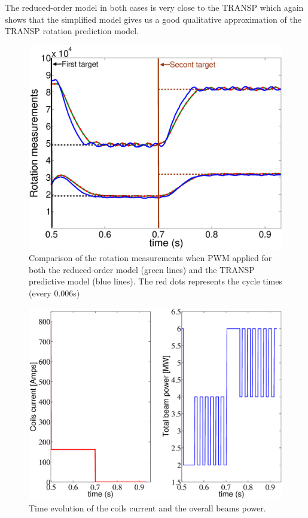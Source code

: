 \documentclass[12pt]{iopart}
\begin{document}
The reduced-order model in both cases is very close to the TRANSP which again shows that the simplified model gives us a good qualitative approximation of the TRANSP rotation prediction model.

\begin{figure}
\centering
\includegraphics[width=\linewidth]{imene_figs/Goum16l}
\caption{Comparison of the rotation measurements when PWM applied for both the reduced-order model (green lines) and the TRANSP predictive model (blue lines). The red dots represents the cycle times (every 0.006s)}
\label{fig:rot16}
\end{figure}

\begin{figure}
\centering
\includegraphics[width=\linewidth]{imene_figs/Goum17l}
\caption{Time evolution of the coils current and the overall beams power.}
\label{fig:rot17}
\end{figure}
\end{document}
